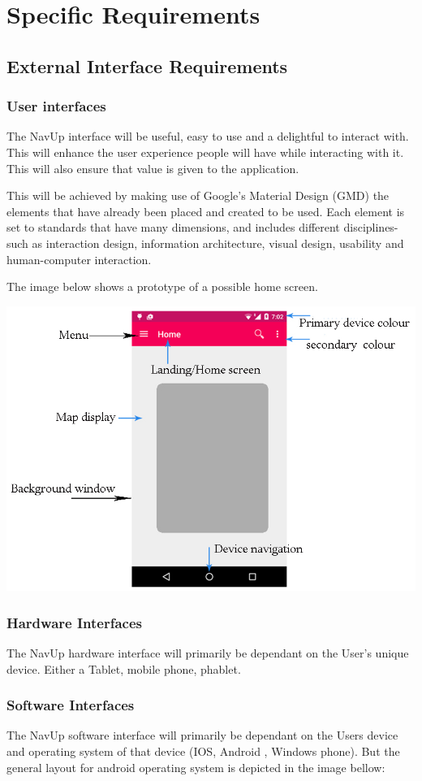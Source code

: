 \documentclass[11pt]{article}
\begin{document}
	\section{Specific Requirements}
	
		\subsection{External Interface Requirements}
      	\subsubsection{User interfaces}
				
				The NavUp interface will be useful, easy to use and a delightful to interact with. This will enhance the user experience people will have while interacting with it. This will also ensure that value is given to the application.
				
				This will be achieved by making use of Google's Material Design (GMD) the elements that have already been placed and created to be used. Each element is set to standards that have many dimensions, and includes different disciplines-such as interaction design, information architecture, visual design, usability and human-computer interaction.
				
				The image below shows a prototype of a possible home screen.
				
				\includegraphics[width=0.5\linewidth]{Images/userInterface.jpg}\\[0.5cm]
				
	\subsubsection{Hardware Interfaces}
				The NavUp hardware interface will primarily be dependant on the User’s unique device. Either a Tablet, mobile phone, phablet. 	
					
	\subsubsection{Software Interfaces}
				The NavUp software  interface will primarily be dependant on the Users device and operating system of that device (IOS, Android , Windows phone). But the general layout for android operating system is depicted in the image bellow:
				
\end{document}
